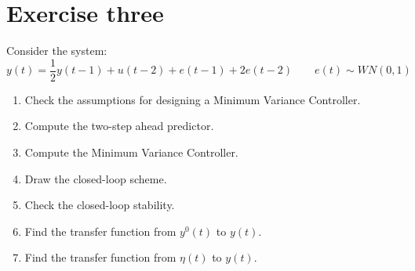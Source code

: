 \section{Exercise three}

Consider the system: 
\[y(t)=\dfrac{1}{2}y(t-1)+u(t-2)+e(t-1)+2e(t-2)\qquad e(t)\sim WN(0,1)\]
\begin{enumerate}
    \item Check the assumptions for designing a Minimum Variance Controller.
    \item Compute the two-step ahead predictor.
    \item Compute the Minimum Variance Controller.
    \item Draw the closed-loop scheme.
    \item Check the closed-loop stability.
    \item Find the transfer function from $y^0(t)$ to $y(t)$. 
    \item Find the transfer function from $\eta(t)$ to $y(t)$. 
\end{enumerate}

